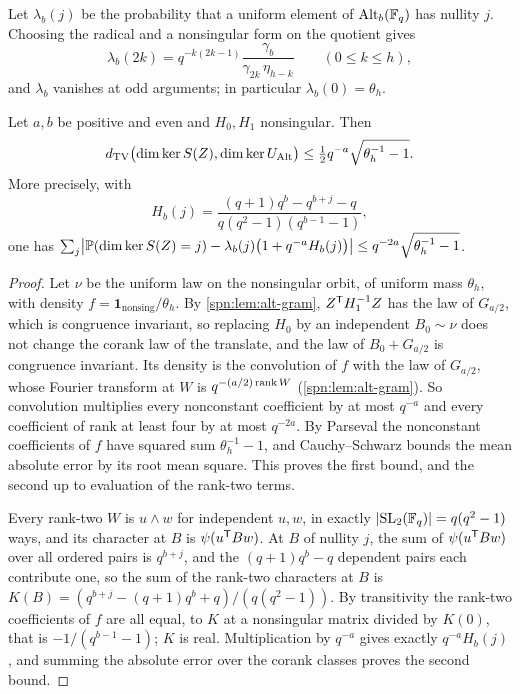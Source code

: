 Let $\lambda_b(j)$ be the probability that a uniform element of $\operatorname{Alt}_b(\mathbb{F}_q)$ has nullity $j$.
Choosing the radical and a nonsingular form on the quotient gives
\begin{equation}\label{spn:eq:finite-alt}
 \lambda_b(2k)=q^{-k(2k-1)}\frac{\gamma_b}{\gamma_{2k}\,\eta_{h-k}}\qquad(0\le k\le h),
\end{equation}
and $\lambda_b$ vanishes at odd arguments; in particular $\lambda_b(0)=\theta_h$.

\begin{lemma}\label{spn:lem:corank-mix}
Let $a,b$ be positive and even and $H_0,H_1$ nonsingular. Then
\[
 d_{\mathrm{TV}}\bigl(\dim\ker S(Z),\dim\ker U_{\operatorname{Alt}}\bigr)\le\tfrac12q^{-a}\sqrt{\theta_h^{-1}-1}.
\]
More precisely, with
\[
 H_b(j)=\frac{(q+1)q^b-q^{b+j}-q}{q(q^2-1)(q^{b-1}-1)},
\]
one has
$\sum_j\bigl|\mathbb{P}(\dim\ker S(Z)=j)-\lambda_b(j)\bigl(1+q^{-a}H_b(j)\bigr)\bigr|
\le q^{-2a}\sqrt{\theta_h^{-1}-1}$.
\end{lemma}

\begin{proof}
Let $\nu$ be the uniform law on the nonsingular orbit, of uniform mass $\theta_h$, with density
$f=\mathbf 1_{\mathrm{nonsing}}/\theta_h$. By \cref{spn:lem:alt-gram}, $Z^{\mathsf{T}}H_1^{-1}Z$ has the
law of $G_{a/2}$, which is congruence invariant, so replacing $H_0$ by an independent $B_0\sim\nu$
does not change the corank law of the translate, and the law of $B_0+G_{a/2}$ is congruence
invariant. Its density is the convolution of $f$ with the law of $G_{a/2}$, whose Fourier transform
at $W$ is $q^{-(a/2)\operatorname{rank} W}$ (\cref{spn:lem:alt-gram}). So convolution multiplies every
nonconstant coefficient by at most $q^{-a}$ and every coefficient of rank at least four by at most
$q^{-2a}$. By Parseval the nonconstant coefficients of $f$ have squared sum $\theta_h^{-1}-1$, and
Cauchy--Schwarz bounds the mean absolute error by its root mean square. This proves the first bound,
and the second up to evaluation of the rank-two terms.

Every rank-two $W$ is $u\wedge w$ for independent $u,w$, in exactly $\lvert\operatorname{SL}_2(\mathbb{F}_q)\rvert=q(q^2-1)$
ways, and its character at $B$ is $\psi(u^{\mathsf{T}}Bw)$. At $B$ of nullity $j$, the sum of
$\psi(u^{\mathsf{T}}Bw)$ over all ordered pairs is $q^{b+j}$, and the $(q+1)q^b-q$ dependent pairs
each contribute one, so the sum of the rank-two characters at $B$ is
$K(B)=(q^{b+j}-(q+1)q^b+q)/(q(q^2-1))$. By transitivity the rank-two coefficients of $f$ are all
equal, to $K$ at a nonsingular matrix divided by $K(0)$, that is $-1/(q^{b-1}-1)$; $K$ is real.
Multiplication by $q^{-a}$ gives exactly $q^{-a}H_b(j)$, and summing the absolute error over the
corank classes proves the second bound.
\end{proof}


